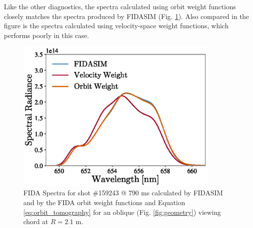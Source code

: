 Like the other diagnostics, the spectra calculated using orbit weight functions closely matches the spectra produced by FIDASIM (Fig. \ref{fig:fida_orbit_spectra}). Also compared in the figure is the spectra calculated using velocity-space weight functions, which performs poorly in this case.
\begin{figure}[h!]
    \centering
    \includegraphics[width=10cm]{figures/fida_orbit_spectra.eps}
    \caption{FIDA Spectra for shot \#159243 @ 790 ms calculated by FIDASIM and by the FIDA orbit weight functions and Equation \ref{eq:orbit_tomography} for an oblique (Fig. \ref{fig:geometry}) viewing chord at $R = 2.1$ m.}
    \label{fig:fida_orbit_spectra}
\end{figure}



